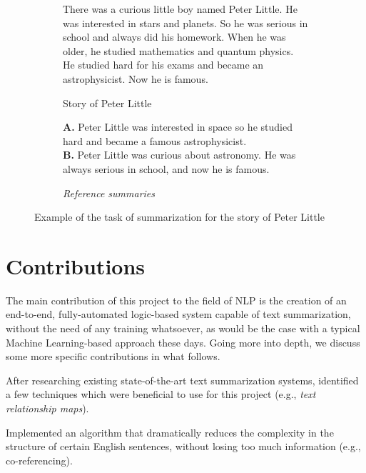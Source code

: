 \begin{figure}[H]
\begin{subfigure}{\textwidth}
\begin{displayquote}
There was a curious little boy named Peter Little. He was interested in stars and planets. So he was serious in school and always did his homework. When he was older, he studied mathematics and quantum physics. He studied hard for his exams and became an astrophysicist. Now he is famous.
\end{displayquote}
\caption{Story of Peter Little}
\vspace{\baselineskip}
\end{subfigure}
\begin{subfigure}{\textwidth}
\begin{displayquote}
\textbf{A.} Peter Little was interested in space so he studied hard and became a famous astrophysicist.\\
\textbf{B.} Peter Little was curious about astronomy. He was always serious in school, and now he is famous.
\end{displayquote}
\caption{\textit{Reference summaries}}
\end{subfigure}
\caption{Example of the task of summarization for the story of Peter Little}
\label{fig:peter_little}
\end{figure}

\section{Contributions}

The main contribution of this project to the field of NLP is the creation of an end-to-end, fully-automated logic-based system capable of text summarization, without the need of any training whatsoever, as would be the case with a typical Machine Learning-based approach these days. Going more into depth, we discuss some more specific contributions in what follows.

\begin{contribution}
After researching existing state-of-the-art text summarization systems, identified a few techniques which were beneficial to use for this project (e.g., \textit{text relationship maps}).
\end{contribution}

\begin{contribution}
Implemented an algorithm that dramatically reduces the complexity in the structure of certain English sentences, without losing too much information (e.g., co-referencing).
\end{contribution}

